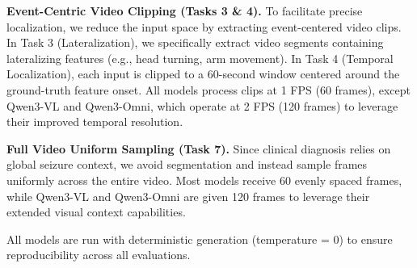 \documentclass{article}
\theoremstyle{plain}
\theoremstyle{definition}
\theoremstyle{remark}
\begin{document}
\textbf{Event-Centric Video Clipping (Tasks 3 \& 4).} To facilitate precise localization, we reduce the input space by extracting event-centered video clips. In Task 3 (Lateralization), we specifically extract video segments containing lateralizing features (e.g., head turning, arm movement). In Task 4 (Temporal Localization), each input is clipped to a 60-second window centered around the ground-truth feature onset. All models process clips at 1 FPS (60 frames), except Qwen3-VL and Qwen3-Omni, which operate at 2 FPS (120 frames) to leverage their improved temporal resolution.

\textbf{Full Video Uniform Sampling (Task 7).} Since clinical diagnosis relies on global seizure context, we avoid segmentation and instead sample frames uniformly across the entire video. Most models receive 60 evenly spaced frames, while Qwen3-VL and Qwen3-Omni are given 120 frames to leverage their extended visual context capabilities.

All models are run with deterministic generation (temperature = 0) to ensure reproducibility across all evaluations.
\end{document}
